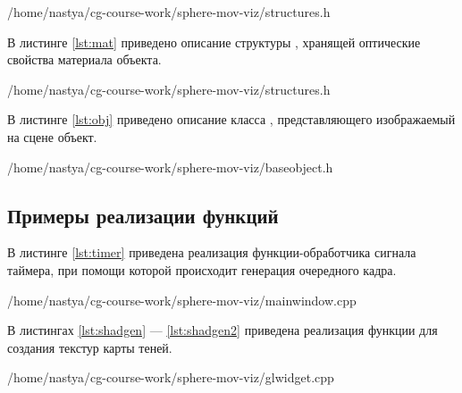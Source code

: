 \begin{lstinputlisting}[
	caption={Класс для реализации карты теней},
	label={lst:sh},
	style={cpp},
	linerange={18-27},
	]{/home/nastya/cg-course-work/sphere-mov-viz/structures.h}
\end{lstinputlisting}

В листинге \ref{lst:mat} приведено описание структуры , хранящей оптические свойства материала объекта.

\begin{lstinputlisting}[
	caption={Структура, описывающая оптические свойства материала объекта},
	label={lst:mat},
	style={cpp},
	linerange={29-34},
	]{/home/nastya/cg-course-work/sphere-mov-viz/structures.h}
\end{lstinputlisting}

В листинге \ref{lst:obj} приведено описание класса , представляющего изображаемый на сцене объект.\pagebreak

\begin{lstinputlisting}[
	caption={Класс, представляющий объект сцены},
	label={lst:obj},
	style={cpp},
	linerange={13-58},
	]{/home/nastya/cg-course-work/sphere-mov-viz/baseobject.h}
\end{lstinputlisting}

\subsection{Примеры реализации функций}

В листинге \ref{lst:timer} приведена реализация функции-обработчика сигнала таймера, при помощи которой происходит генерация очередного кадра.

\begin{lstinputlisting}[
	caption={Обработчик сигнала таймера},
	label={lst:timer},
	style={cpp},
	linerange={95-114},
	]{/home/nastya/cg-course-work/sphere-mov-viz/mainwindow.cpp}
\end{lstinputlisting}

В листингах \ref{lst:shadgen} --- \ref{lst:shadgen2} приведена реализация функции для создания текстур карты теней.

\begin{lstinputlisting}[
	caption={Функция для создания текстур карты теней},
	label={lst:shadgen},
	style={cpp},
	linerange={129-140},
	]{/home/nastya/cg-course-work/sphere-mov-viz/glwidget.cpp}
\end{lstinputlisting}
\pagebreak

